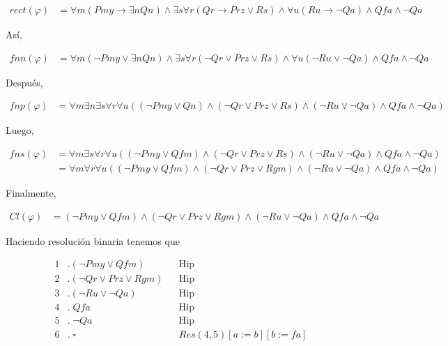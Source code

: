 \documentclass[letterpaper,12pt]{article}
\begin{document}
\begin{enumerate}
\begin{enumerate}
        \begin{align*}
            rect(\varphi) &= 
            \forall m (Pmy \rightarrow \exists n Qn) \land 
            \exists s \forall r (Qr \rightarrow Prz \lor Rs) \land 
            \forall u (Ru \rightarrow \neg Qa) \land Qfa \land \neg Qa
        \end{align*}

        Así,
        
        \begin{align*}
            fnn(\varphi) &=
            \forall m (\neg Pmy \lor \exists n Qn) \land 
            \exists s \forall r (\neg Qr \lor Prz \lor Rs) \land 
            \forall u (\neg Ru \lor \neg Qa) \land Qfa \land \neg Qa 
        \end{align*}

        Después, 
        
        \begin{align*}
            fnp(\varphi) &=
            \forall m \exists n \exists s \forall r \forall u
            ((\neg Pmy \lor Qn) \land (\neg Qr \lor Prz \lor Rs) \land 
            (\neg Ru \lor \neg Qa) \land Qfa \land \neg Qa)
        \end{align*}

        \newpage
        Luego, 
        
        \begin{align*}
            fns(\varphi) &= 
            \forall m \exists s \forall r \forall u
            ((\neg Pmy \lor Qfm) \land (\neg Qr \lor Prz \lor Rs) \land 
            (\neg Ru \lor \neg Qa) \land Qfa \land \neg Qa) \\
            &= 
            \forall m \forall r \forall u
            ((\neg Pmy \lor Qfm) \land (\neg Qr \lor Prz \lor Rgm) \land 
            (\neg Ru \lor \neg Qa) \land Qfa \land \neg Qa)
        \end{align*}

        Finalmente, 
        
        \begin{align*}
            Cl(\varphi) &=
            (\neg Pmy \lor Qfm) \land (\neg Qr \lor Prz \lor Rgm) \land 
            (\neg Ru \lor \neg Qa) \land Qfa \land \neg Qa
        \end{align*}

        Haciendo resolución binaria tenemos que 
        
        \begin{align*}
            1 &. (\neg Pmy \lor Qfm) 
            && \text{Hip} \\
            2 &. (\neg Qr \lor Prz \lor Rgm)
            && \text{Hip} \\
            3 &. (\neg Ru \lor \neg Qa)
            && \text{Hip} \\ 
            4 &. \; Qfa 
            && \text{Hip} \\
            5 &. \; \neg Qa
            && \text{Hip} \\
            6 &. \; \square
            && \text{$Res(4,5) [a := b][b := fa]$}
        \end{align*}


\end{enumerate}
\end{enumerate}
\end{document}
